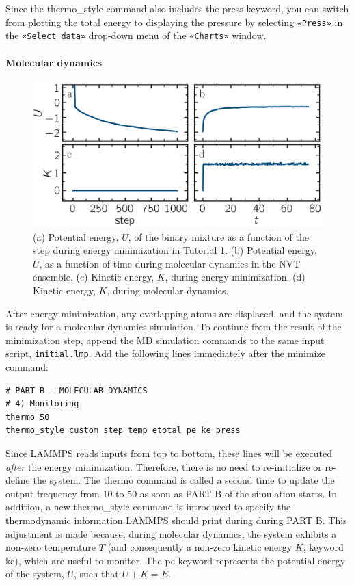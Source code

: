 \documentclass[9pt,tutorial]{livecoms}
\newcommand{\lmpcmd}[1]{\hspace{0pt}\colorbox{listing}{\textcolor{command}{\small{#1}}}\hspace{0pt}} %
\newcommand{\flecmd}[1]{\textcolor{command}{\texttt{#1}}} %
\newcommand{\guicmd}[1]{\textcolor{command}{\texttt{«#1»}}} %
\begin{document}
\begin{note}
Since the \lmpcmd{thermo\_style} command also includes the \lmpcmd{press}
keyword, you can switch from plotting the total energy to
displaying the pressure by selecting \guicmd{Press} in the \guicmd{Select data}
drop-down menu of the \guicmd{Charts} window.
\end{note}

\paragraph{Molecular dynamics}

\begin{figure}
\centering
\includegraphics[width=\linewidth]{LJ-energy}
\caption{(a) Potential energy, $U$, of the binary mixture as a function of the
step during energy minimization in \hyperref[lennard-jones-label]{Tutorial 1}.
(b) Potential energy, $U$, as a function of time during molecular dynamics in
the NVT ensemble.  (c) Kinetic energy, $K$, during energy minimization.
(d) Kinetic energy, $K$, during molecular dynamics.}
\label{fig:evolution-energy}
\end{figure}

After energy minimization, any overlapping atoms are displaced, and
the system is ready for a molecular dynamics simulation.  To continue
from the result of the minimization step, append the MD simulation
commands to the same input script, \flecmd{initial.lmp}.  Add the
following lines immediately after the \lmpcmd{minimize} command:
\begin{lstlisting}
# PART B - MOLECULAR DYNAMICS
# 4) Monitoring
thermo 50
thermo_style custom step temp etotal pe ke press
\end{lstlisting}

Since LAMMPS reads inputs from top to bottom, these lines will
be executed \emph{after} the energy minimization.  Therefore,
there is no need to re-initialize or re-define the
system.  The \lmpcmd{thermo} command is called a second time to
update the output frequency from 10 to 50 as soon as \lmpcmd{PART B} of
the simulation starts.  In addition, a new \lmpcmd{thermo\_style}
command is introduced to specify the thermodynamic information LAMMPS should
print during during \lmpcmd{PART B}.  This adjustment is made because, during
molecular dynamics, the system exhibits a non-zero temperature $T$ (and
consequently a non-zero kinetic energy $K$, keyword \lmpcmd{ke}), which are useful to monitor.
The \lmpcmd{pe} keyword represents the potential energy of the system, $U$, such that
$U + K = E$.
\end{document}
